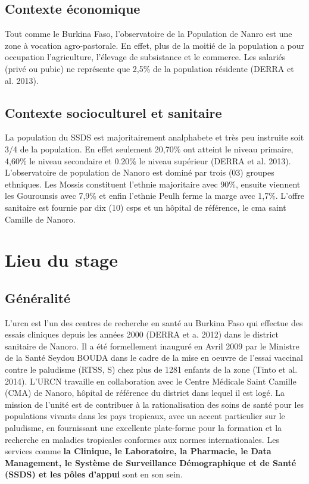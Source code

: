 \documentclass[12pt]{report}
\begin{document}
			\subsection{Contexte économique}
			
			Tout comme le Burkina Faso, l'observatoire de la Population de Nanro est une zone à vocation agro-pastorale. En effet, plus de la moitié de la population a pour occupation l'agriculture, l'élevage de subsistance et le commerce. Les salariés (privé ou pubic) ne représente que 2,5\% de la population résidente (DERRA et al. 2013).
			
			\subsection{Contexte socioculturel et sanitaire}
			
			La population du SSDS est majoritairement analphabete et très peu instruite soit 3/4 de la population. En effet seulement 20,70\% ont atteint le niveau primaire, 4,60\% le niveau secondaire et 0.20\% le niveau supérieur (DERRA et al. 2013). L'observatoire de population de Nanoro est dominé par trois (03) groupes ethniques. Les Mossis constituent l'ethnie majoritaire avec 90\%, ensuite viennent les Gourounsis avec 7,9\% et enfin l'ethnie Peulh ferme la marge avec 1,7\%. L'offre sanitaire est fournie par dix (10) \gls{csps} et un hôpital de référence, le \gls{cma} saint Camille de Nanoro.
			
		\section{Lieu du stage}
			\subsection{Généralité}
			
			L'\gls{urcn} est l'un des centres de recherche en santé au Burkina Faso qui effectue des essais cliniques depuis les années 2000 (DERRA et a. 2012) dans le district sanitaire de Nanoro. Il a été formellement inauguré en Avril 2009 par le Ministre de la Santé Seydou BOUDA dans le cadre de la mise en oeuvre de l'essai vaccinal contre le paludisme (RTSS, S) chez plus de 1281 enfants de la zone (Tinto et al. 2014). L'URCN travaille en collaboration avec le Centre Médicale Saint Camille (CMA) de Nanoro, hôpital de référence du district dans lequel il est logé. La mission de l'unité est de contribuer à la rationalisation des soins de santé pour les populations vivants dans les pays tropicaux, avec un accent particulier sur le paludisme, en fournissant une excellente plate-forme pour la formation et la recherche en maladies tropicales conformes aux normes internationales. Les services comme \textbf{la Clinique, le Laboratoire, la Pharmacie, le Data Management, le Système de Surveillance Démographique et de Santé (SSDS) et les pôles d'appui} sont en son sein.
			
\end{document}
